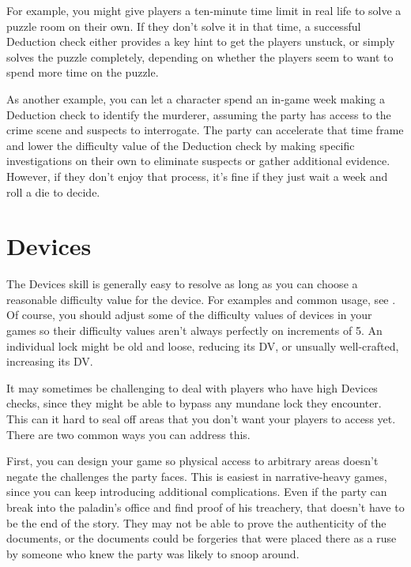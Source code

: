     For example, you might give players a ten-minute time limit in real life to solve a puzzle room on their own.
    If they don't solve it in that time, a successful Deduction check either provides a key hint to get the players unstuck, or simply solves the puzzle completely, depending on whether the players seem to want to spend more time on the puzzle.

    As another example, you can let a character spend an in-game week making a Deduction check to identify the murderer, assuming the party has access to the crime scene and suspects to interrogate.
    The party can accelerate that time frame and lower the difficulty value of the Deduction check by making specific investigations on their own to eliminate suspects or gather additional evidence.
    However, if they don't enjoy that process, it's fine if they just wait a week and roll a die to decide.

\section{Devices}

    The Devices skill is generally easy to resolve as long as you can choose a reasonable difficulty value for the device.
    For examples and common usage, see .
    Of course, you should adjust some of the difficulty values of devices in your games so their difficulty values aren't always perfectly on increments of 5.
    An individual lock might be old and loose, reducing its DV, or unsually well-crafted, increasing its DV.

    It may sometimes be challenging to deal with players who have high Devices checks, since they might be able to bypass any mundane lock they encounter.
    This can it hard to seal off areas that you don't want your players to access yet.
    There are two common ways you can address this.

    First, you can design your game so physical access to arbitrary areas doesn't negate the challenges the party faces.
    This is easiest in narrative-heavy games, since you can keep introducing additional complications.
    Even if the party can break into the paladin's office and find proof of his treachery, that doesn't have to be the end of the story.
    They may not be able to prove the authenticity of the documents, or the documents could be forgeries that were placed there as a ruse by someone who knew the party was likely to snoop around.

